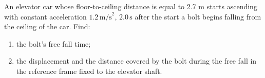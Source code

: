 
\item An elevator car whose floor-to-ceiling distance is equal to 2.7 m starts ascending with constant acceleration \(1.2 \, \text{m/s}^2\), \(2.0 \, \text{s}\) after the start a bolt begins falling from the ceiling of the car. Find:
    \begin{enumerate}
        \item the bolt's free fall time;
        \item the displacement and the distance covered by the bolt during the free fall in the reference frame fixed to the elevator shaft.
    \end{enumerate}
